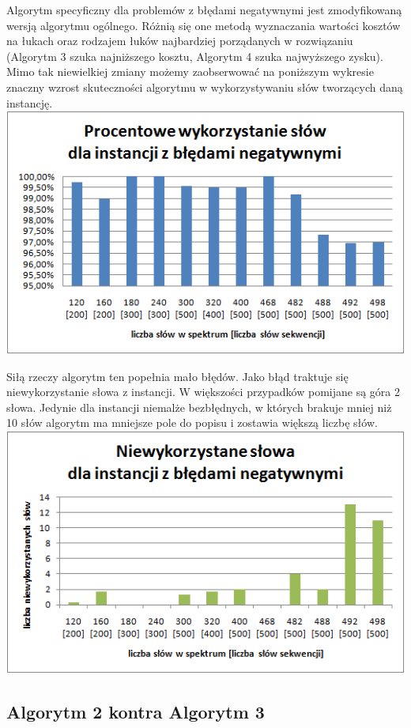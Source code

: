 \documentclass[a4paper]{article}
\begin{document}
Algorytm specyficzny dla problemów z błędami negatywnymi jest zmodyfikowaną wersją algorytmu ogólnego. Różnią się one metodą wyznaczania wartości kosztów na łukach oraz rodzajem łuków najbardziej porządanych w rozwiązaniu (Algorytm 3 szuka najniższego kosztu, Algorytm 4 szuka najwyższego zysku). Mimo tak niewielkiej zmiany możemy zaobserwować na poniższym wykresie znaczny wzrost skuteczności algorytmu w wykorzystywaniu słów tworzących daną instancję.
\includegraphics{percentageUsedWords_negative.png}

Siłą rzeczy algorytm ten popełnia mało błędów. Jako błąd traktuje się niewykorzystanie słowa z instancji. W większości przypadków pomijane są góra 2 słowa. Jedynie dla instancji niemalże bezbłędnych, w których brakuje mniej niż 10 słów algorytm ma mniejsze pole do popisu i zostawia większą liczbę słów.
\includegraphics{unusedWords_negative.png}

\subsection{Algorytm 2 kontra Algorytm 3}
\end{document}
